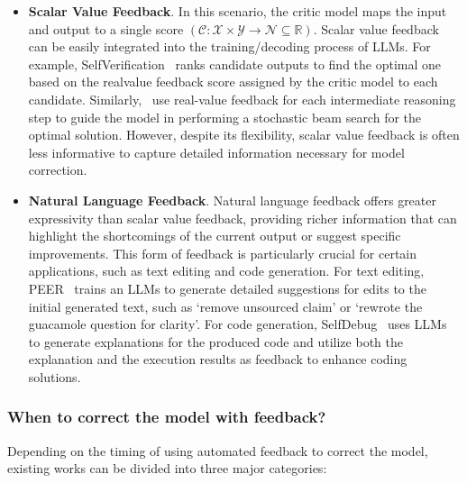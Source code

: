 \documentclass[12pt]{extarticle}
\begin{document}
\begin{itemize}
    \item \textbf{Scalar Value Feedback}. In this scenario, the critic model maps the input and output to a single score $(\mathcal{C}: \mathcal{X} \times \mathcal{Y} \rightarrow \mathcal{N} \subseteq \mathbb{R})$. Scalar value feedback can be easily integrated into the training/decoding process of LLMs. For example, SelfVerification~\cite{weng2023large} ranks candidate outputs to find the optimal one based on the realvalue feedback score assigned by the critic model to each candidate. Similarly,~\cite{xie2023selfevaluation} use real-value feedback for each intermediate reasoning step to guide the model in performing a stochastic beam search for the optimal solution. However, despite its flexibility, scalar value feedback is often less informative to capture detailed information necessary for model correction.

    \item \textbf{Natural Language Feedback}. Natural language feedback offers greater expressivity than scalar value feedback, providing richer information that can highlight the shortcomings of the current output or suggest specific improvements. This form of feedback is particularly crucial for certain applications, such as text editing and code generation. For text editing, PEER~\cite{schick2022peer} trains an LLMs to generate detailed suggestions for edits to the initial generated text, such as `remove unsourced claim' or `rewrote the guacamole question for clarity'. For code generation, SelfDebug~\cite{chen2023teaching} uses LLMs to generate explanations for the produced code and utilize both the explanation and the execution results as feedback to enhance coding solutions.
\end{itemize}

\subsubsection{When to correct the model with feedback?}
Depending on the timing of using automated feedback to correct the model, existing works can be divided into three major categories:
\end{document}
